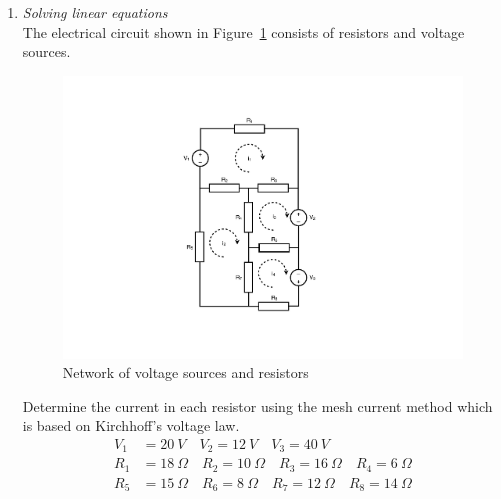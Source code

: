 \begin{enumerate}
\item \textit{Solving linear equations}\\
The electrical circuit shown in Figure~\ref{fig:circuit} consists of resistors and voltage sources. 
\begin{figure}[h]
	\myfloatalign
	\includegraphics[width=0.65\linewidth]{Graphics/Additional-Ex/resistor-net}
	\caption{Network of voltage sources and resistors}
	\label{fig:circuit}
\end{figure}
Determine the current in each resistor using the mesh current method which is based on Kirchhoff's voltage law.
\begin{align*}
V_1 &= 20~V \quad V_2 = 12~V \quad V_3 = 40~V \\
R_1 &= 18~\Omega \quad R_2 = 10~\Omega \quad R_3 = 16~\Omega \quad R_4 = 6~\Omega \\
R_5 &= 15~\Omega \quad R_6 = 8~\Omega \quad R_7 = 12~\Omega \quad R_8 = 14~\Omega
\end{align*}
\addtolength{\parindent}{-4mm}
\end{enumerate}
